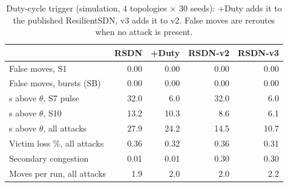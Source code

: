 \begin{table}[t]\centering\scriptsize
\caption{Duty-cycle trigger (simulation, 4 topologies $\times$ 30 seeds): +Duty adds it to the published ResilientSDN, v3 adds it to v2. False moves are reroutes when no attack is present.}
\label{tab:v3}
\begin{tabular}{lrrrr}
\toprule
 & RSDN & +Duty & RSDN-v2 & RSDN-v3\\
\midrule
False moves, S1 & 0.00 & 0.00 & 0.00 & 0.00\\
False moves, bursts (SB) & 0.00 & 0.00 & 0.00 & 0.00\\
s above $\theta$, S7 pulse & 32.0 & 6.0 & 32.0 & 6.0\\
s above $\theta$, S10 & 13.2 & 10.3 & 8.6 & 6.1\\
s above $\theta$, all attacks & 27.9 & 24.2 & 14.5 & 10.7\\
Victim loss \%, all attacks & 0.36 & 0.32 & 0.36 & 0.31\\
Secondary congestion & 0.01 & 0.01 & 0.30 & 0.30\\
Moves per run, all attacks & 1.9 & 2.0 & 2.0 & 2.2\\
\bottomrule
\end{tabular}
\end{table}